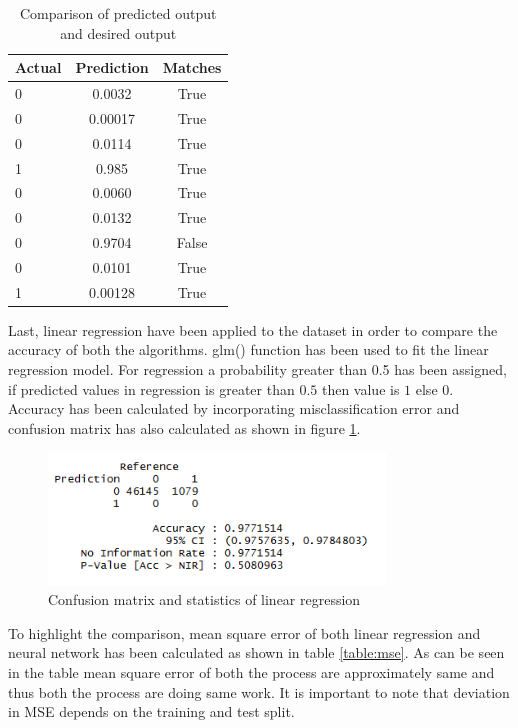 \documentclass{article}[]
\begin{document}
\begin{table} 
\caption{Comparison of predicted output and desired output} %
\centering      %
\begin{tabular}{l|c|c}  %
\hline                      %
{\bf Actual}&{\bf Prediction}&{\bf Matches}\\
\hline                    %
0 & 0.0032 & True\\
0 & 0.00017 & True\\
0 & 0.0114 & True\\
1 & 0.985 & True\\
0 & 0.0060 & True\\
0 & 0.0132 & True\\
0 & 0.9704 & False\\
0 & 0.0101 & True\\
1 & 0.00128 & True\\
\hline     %
\end{tabular} 
\label{table:result} 
\end{table}
Last, linear regression \cite{laitinen1999predicting} have been applied to the dataset in order to compare the accuracy of both the algorithms. glm() function has been used to fit the linear regression model. For regression a probability greater than 0.5 has been assigned, if predicted values in regression is greater than $0.5$ then value is $1$ else $0$. Accuracy has been calculated by incorporating misclassification error and confusion matrix has also calculated as shown in figure \ref{fig:image5}.\\
\begin{figure}[!htb]
\centering
\includegraphics[width=0.8\textwidth]{image5.png}
\caption{Confusion matrix and statistics of linear regression}
\label{fig:image5}
\end{figure}
To highlight the comparison, mean square error of both linear regression and neural network has been calculated as shown in table \ref{table:mse}. As can be seen in the table mean square error of both the process are approximately same and thus both the process are doing same work. It is important to note that deviation in MSE depends on the training and test split.  
\end{document}
